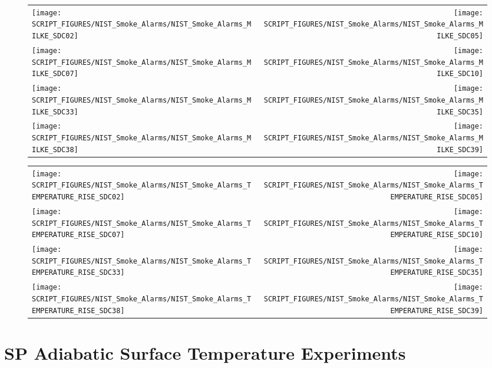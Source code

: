 \begin{figure}[!ht]
\begin{tabular*}{\textwidth}{l@{\extracolsep{\fill}}r}
\texttt{[image: SCRIPT\_FIGURES/NIST\_Smoke\_Alarms/NIST\_Smoke\_Alarms\_MILKE\_SDC02]} &
\texttt{[image: SCRIPT\_FIGURES/NIST\_Smoke\_Alarms/NIST\_Smoke\_Alarms\_MILKE\_SDC05]} \\
\texttt{[image: SCRIPT\_FIGURES/NIST\_Smoke\_Alarms/NIST\_Smoke\_Alarms\_MILKE\_SDC07]} &
\texttt{[image: SCRIPT\_FIGURES/NIST\_Smoke\_Alarms/NIST\_Smoke\_Alarms\_MILKE\_SDC10]} \\
\texttt{[image: SCRIPT\_FIGURES/NIST\_Smoke\_Alarms/NIST\_Smoke\_Alarms\_MILKE\_SDC33]} &
\texttt{[image: SCRIPT\_FIGURES/NIST\_Smoke\_Alarms/NIST\_Smoke\_Alarms\_MILKE\_SDC35]} \\
\texttt{[image: SCRIPT\_FIGURES/NIST\_Smoke\_Alarms/NIST\_Smoke\_Alarms\_MILKE\_SDC38]} &
\texttt{[image: SCRIPT\_FIGURES/NIST\_Smoke\_Alarms/NIST\_Smoke\_Alarms\_MILKE\_SDC39]}
\end{tabular*}
\end{figure}

\begin{figure}[!ht]
\begin{tabular*}{\textwidth}{l@{\extracolsep{\fill}}r}
\texttt{[image: SCRIPT\_FIGURES/NIST\_Smoke\_Alarms/NIST\_Smoke\_Alarms\_TEMPERATURE\_RISE\_SDC02]} &
\texttt{[image: SCRIPT\_FIGURES/NIST\_Smoke\_Alarms/NIST\_Smoke\_Alarms\_TEMPERATURE\_RISE\_SDC05]} \\
\texttt{[image: SCRIPT\_FIGURES/NIST\_Smoke\_Alarms/NIST\_Smoke\_Alarms\_TEMPERATURE\_RISE\_SDC07]} &
\texttt{[image: SCRIPT\_FIGURES/NIST\_Smoke\_Alarms/NIST\_Smoke\_Alarms\_TEMPERATURE\_RISE\_SDC10]} \\
\texttt{[image: SCRIPT\_FIGURES/NIST\_Smoke\_Alarms/NIST\_Smoke\_Alarms\_TEMPERATURE\_RISE\_SDC33]} &
\texttt{[image: SCRIPT\_FIGURES/NIST\_Smoke\_Alarms/NIST\_Smoke\_Alarms\_TEMPERATURE\_RISE\_SDC35]} \\
\texttt{[image: SCRIPT\_FIGURES/NIST\_Smoke\_Alarms/NIST\_Smoke\_Alarms\_TEMPERATURE\_RISE\_SDC38]} &
\texttt{[image: SCRIPT\_FIGURES/NIST\_Smoke\_Alarms/NIST\_Smoke\_Alarms\_TEMPERATURE\_RISE\_SDC39]}
\end{tabular*}
\end{figure}

\clearpage

\section{SP Adiabatic Surface Temperature Experiments}

